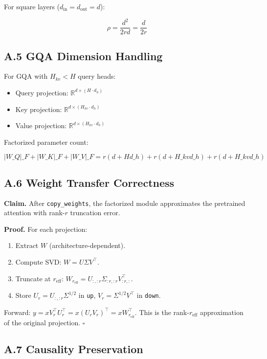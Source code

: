 For square layers ($d_\text{in} = d_\text{out} = d$):

\[
\rho = \frac{d^2}{2rd} = \frac{d}{2r}
\tag{A.6}
\]

\subsection{A.5 GQA Dimension Handling}

For GQA with $H_{kv} < H$ query heads:

\begin{itemize}
\item Query projection: $\mathbb{R}^{d \times (H \cdot d_h)}$
\item Key projection: $\mathbb{R}^{d \times (H_{kv} \cdot d_h)}$
\item Value projection: $\mathbb{R}^{d \times (H_{kv} \cdot d_h)}$

\end{itemize}
Factorized parameter count:

\[
|W\_Q|\_F + |W\_K|\_F + |W\_V|\_F = r(d + H d\_h) + r(d + H\_{kv} d\_h) + r(d + H\_{kv} d\_h)
\tag{A.7}
\]

\subsection{A.6 Weight Transfer Correctness}

\textbf{Claim.} After \texttt{copy\_weights}, the factorized module approximates the 
pretrained attention with rank-$r$ truncation error.

\textbf{Proof.} For each projection:
\begin{enumerate}
\item Extract $W$ (architecture-dependent).
\item Compute SVD: $W = U \Sigma V^\top$.
\item Truncate at $r_\text{eff}$: $W_{r_\text{eff}} = U_{:, :r} \Sigma_{:r, :r} V_{:r, :}^\top$.
\item Store $U_r = U_{:, :r} \Sigma^{1/2}$ in \texttt{up}, $V_r = \Sigma^{1/2} V^\top$ in \texttt{down}.

\end{enumerate}
Forward: $y = x V_r^\top U_r^\top = x (U_r V_r)^\top = x W_{r_\text{eff}}^\top$. 
This is the rank-$r_\text{eff}$ approximation of the original projection. $\square$

\subsection{A.7 Causality Preservation}

